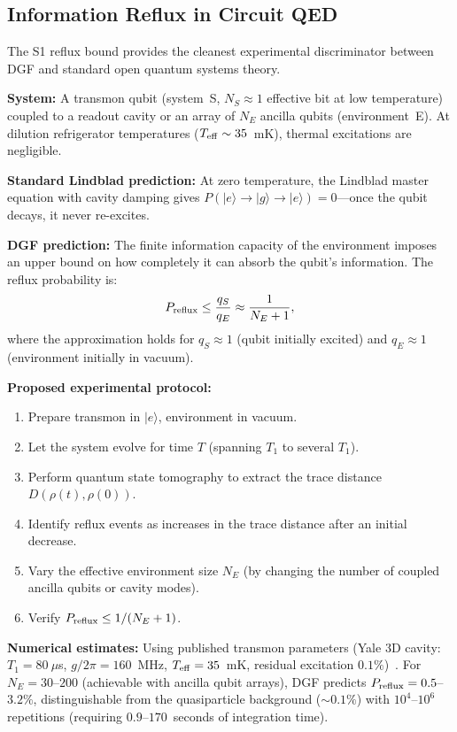 \documentclass[reprint]{revtex4-2}
\begin{document}
\subsection{Information Reflux in Circuit QED}

The S1 reflux bound provides the cleanest experimental discriminator between DGF and standard open quantum systems theory.

\textbf{System:} A transmon qubit (system~S, $N_S\approx 1$ effective bit at low temperature) coupled to a readout cavity or an array of $N_E$ ancilla qubits (environment~E). At dilution refrigerator temperatures ($T_{\rm eff}\sim 35$~mK), thermal excitations are negligible.

\textbf{Standard Lindblad prediction:} At zero temperature, the Lindblad master equation with cavity damping gives $P(|e\rangle\to|g\rangle\to|e\rangle)=0$---once the qubit decays, it never re-excites.

\textbf{DGF prediction:} The finite information capacity of the environment imposes an upper bound on how completely it can absorb the qubit's information. The reflux probability is:
\begin{equation}
P_{\rm reflux} \le \frac{q_S}{q_E} \approx \frac{1}{N_E+1},
\end{equation}
where the approximation holds for $q_S\approx 1$ (qubit initially excited) and $q_E\approx 1$ (environment initially in vacuum).

\textbf{Proposed experimental protocol:}
\begin{enumerate}
\item Prepare transmon in $|e\rangle$, environment in vacuum.
\item Let the system evolve for time $T$ (spanning $T_1$ to several $T_1$).
\item Perform quantum state tomography to extract the trace distance $D(\rho(t),\rho(0))$.
\item Identify reflux events as increases in the trace distance after an initial decrease.
\item Vary the effective environment size $N_E$ (by changing the number of coupled ancilla qubits or cavity modes).
\item Verify $P_{\rm reflux}\le 1/(N_E+1)$.
\end{enumerate}

\textbf{Numerical estimates:} Using published transmon parameters (Yale 3D cavity: $T_1=80~\mu$s, $g/2\pi=160$~MHz, $T_{\rm eff}=35$~mK, residual excitation $0.1\%$)~\cite{Jin2015}. For $N_E=30$--$200$ (achievable with ancilla qubit arrays), DGF predicts $P_{\rm reflux}=0.5$--$3.2\%$, distinguishable from the quasiparticle background ($\sim 0.1\%$) with $10^4$--$10^6$ repetitions (requiring $0.9$--$170$~seconds of integration time).
\end{document}
